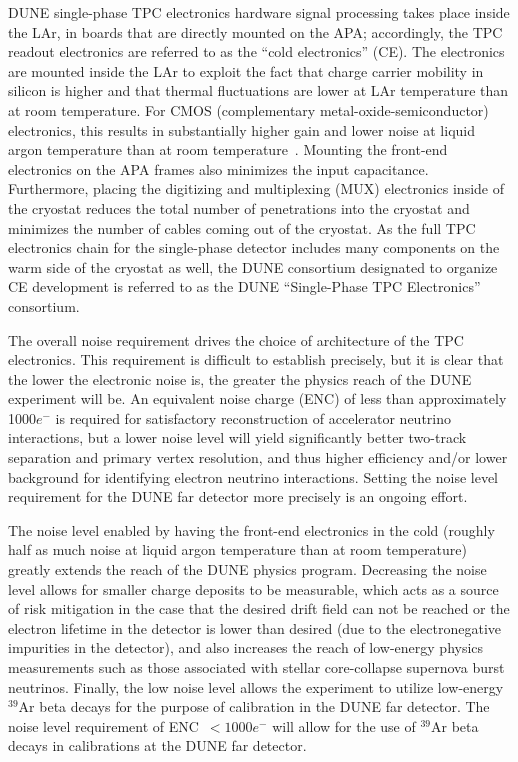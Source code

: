 DUNE single-phase TPC electronics hardware signal processing takes place inside the LAr, in boards that are directly mounted on the APA; accordingly, the TPC readout electronics are referred to as the ``cold electronics'' (CE).  The electronics are mounted inside the LAr to exploit the fact that charge carrier mobility in silicon is higher and that thermal fluctuations are lower at LAr temperature than at room temperature.  For CMOS (complementary metal-oxide-semiconductor) electronics, this results in substantially higher gain and lower noise at liquid argon temperature than at room temperature~\cite{LArCMOS}.  Mounting the front-end electronics on the APA frames also minimizes the input capacitance.  Furthermore, placing the digitizing and multiplexing (MUX) electronics inside of the cryostat reduces the total number of penetrations into the cryostat and minimizes the number of cables coming out of the cryostat.  As the full TPC electronics chain for the single-phase detector includes many components on the warm side of the cryostat as well, the DUNE consortium designated to organize CE development is referred to as the DUNE ``Single-Phase TPC Electronics'' consortium.

The overall noise requirement drives the choice of architecture of the TPC electronics. This requirement is difficult to establish precisely, but it is clear that the lower the electronic noise is, the greater the physics reach of the DUNE experiment will be.  An equivalent noise charge (ENC) of less than approximately 1000$e^-$ is required for satisfactory reconstruction of accelerator neutrino interactions, but a lower noise level will yield significantly better two-track separation and primary vertex resolution, and thus higher efficiency and/or lower background for identifying electron neutrino interactions.  Setting the noise level requirement for the DUNE far detector more precisely is an ongoing effort.

The noise level enabled by having the front-end electronics in the cold (roughly half as much noise at liquid argon temperature than at room temperature) greatly extends the reach of the DUNE physics program.  Decreasing the noise level allows for smaller charge deposits to be measurable, which acts as a source of risk mitigation in the case that the desired drift field can not be reached or the electron lifetime in the detector is lower than desired (due to the electronegative impurities in the detector), and also increases the reach of low-energy physics measurements such as those associated with stellar core-collapse supernova burst neutrinos.  Finally, the low noise level allows the experiment to utilize low-energy $\mathrm{{}^{39}Ar}$ beta decays for the purpose of calibration in the DUNE far detector.  The noise level requirement of ENC~$< 1000e^-$ will allow for the use of $\mathrm{{}^{39}Ar}$ beta decays in calibrations at the DUNE far detector.

